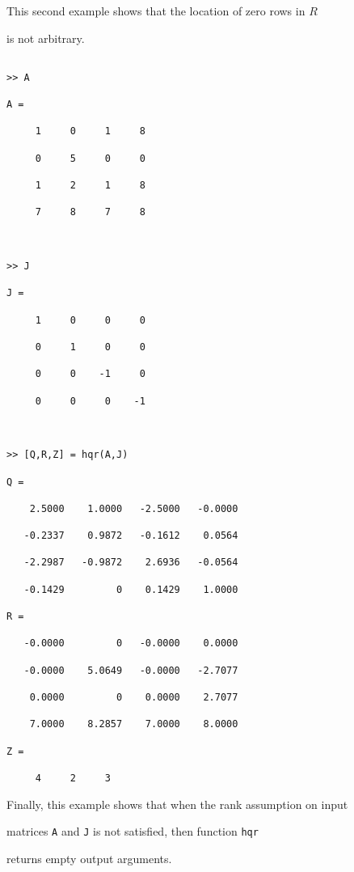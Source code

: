 \documentclass[12pt,a4paper]{article}
\begin{document}
This second example shows that the location of zero rows in $R$

is not arbitrary.

\begin{verbatim}

>> A

A =

     1     0     1     8

     0     5     0     0

     1     2     1     8

     7     8     7     8



>> J 

J =

     1     0     0     0

     0     1     0     0

     0     0    -1     0

     0     0     0    -1



>> [Q,R,Z] = hqr(A,J)

Q =

    2.5000    1.0000   -2.5000   -0.0000

   -0.2337    0.9872   -0.1612    0.0564

   -2.2987   -0.9872    2.6936   -0.0564

   -0.1429         0    0.1429    1.0000

R =

   -0.0000         0   -0.0000    0.0000

   -0.0000    5.0649   -0.0000   -2.7077

    0.0000         0    0.0000    2.7077

    7.0000    8.2857    7.0000    8.0000

Z =

     4     2     3

\end{verbatim}



Finally, this example shows that when the rank assumption on input

matrices {\tt A} and {\tt J} is not satisfied, then function {\tt hqr}

returns empty output arguments.
\end{document}
